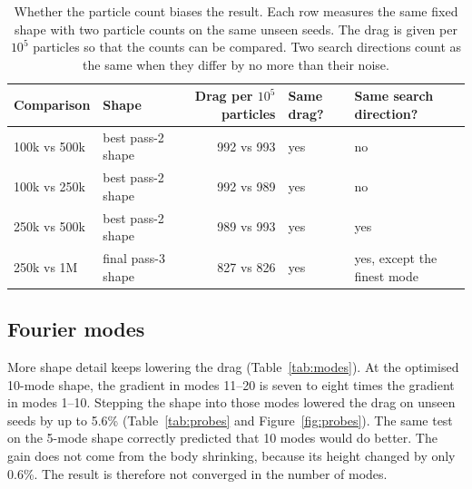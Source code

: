 \documentclass[10pt]{article}
\begin{document}
\begin{table}[H]
\centering
\small
\caption{\label{tab:bias}Whether the particle count biases the result. Each row measures the same fixed shape with two particle counts on the same unseen seeds. The drag is given per $10^5$ particles so that the counts can be compared. Two search directions count as the same when they differ by no more than their noise.}
\begin{tabular}{llrll}
\toprule
Comparison & Shape & Drag per $10^5$ particles & Same drag? & Same search direction? \\
\midrule
100k vs 500k & best pass-2 shape & 992 vs 993 & yes & no \\
100k vs 250k & best pass-2 shape & 992 vs 989 & yes & no \\
250k vs 500k & best pass-2 shape & 989 vs 993 & yes & yes \\
250k vs 1M & final pass-3 shape & 827 vs 826 & yes & yes, except the finest mode \\
\bottomrule
\end{tabular}
\par{}
\end{table}


\subsection{Fourier modes}
More shape detail keeps lowering the drag (Table~\ref{tab:modes}).
At the optimised 10-mode shape, the gradient in modes 11--20 is seven to eight times the gradient in modes 1--10.
Stepping the shape into those modes lowered the drag on unseen seeds by up to 5.6\% (Table~\ref{tab:probes} and Figure~\ref{fig:probes}).
The same test on the 5-mode shape correctly predicted that 10 modes would do better.
The gain does not come from the body shrinking, because its height changed by only 0.6\%.
The result is therefore not converged in the number of modes.
\end{document}
